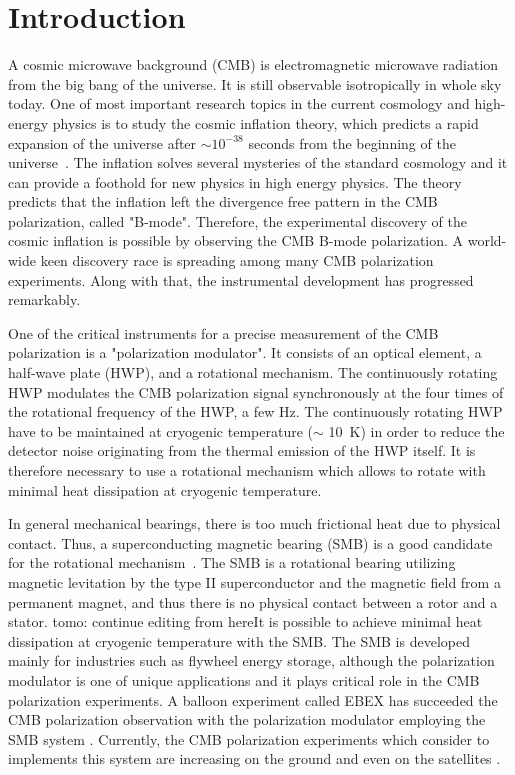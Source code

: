 \documentclass[a4paper]{jpconf}
\newcommand{\cred}[1]{{\color{red}#1}}
\begin{document}
\section*{Introduction}

A cosmic microwave background (CMB) is electromagnetic microwave radiation from the big bang of the universe.
It is still observable isotropically in whole sky today.
One of most important research topics in the current cosmology and high-energy physics is to study the cosmic inflation theory, which predicts a rapid expansion of the universe after $\sim 10^{-38}$ seconds from the beginning of the universe~\cite{inflation_sato,inflation_guth}.
The inflation solves several mysteries of the standard cosmology and it can provide a foothold for new physics in high energy physics.
The theory predicts that the inflation left the divergence free pattern in the CMB polarization,  called "B-mode".
Therefore, the experimental discovery of the cosmic inflation is possible by observing the CMB B-mode polarization.
A world-wide keen discovery race is spreading among many CMB polarization experiments.
Along with that, the instrumental development has progressed remarkably.

One of the critical instruments for a precise measurement of the CMB polarization is a "polarization modulator".
It consists of an optical element, a half-wave plate (HWP), and a rotational mechanism.
The continuously rotating HWP modulates the CMB polarization signal synchronously at the four times of the rotational frequency of the HWP, a few Hz.
The continuously rotating HWP have to be maintained at cryogenic temperature ($\sim$ 10~K) in order to reduce the detector noise originating from the thermal emission of the HWP itself.
It is therefore necessary to use a rotational mechanism which allows to rotate with minimal heat dissipation at cryogenic temperature.

In general mechanical bearings, there is too much frictional heat due to physical contact.
Thus, a superconducting magnetic bearing (SMB) is a good candidate for the rotational mechanism~\cite{smb}.
The SMB is a rotational bearing utilizing magnetic levitation by the type II superconductor and the magnetic field from a permanent magnet, and thus there is no physical contact between a rotor and a stator.
\cred{tomo: continue editing from here}It is possible to achieve minimal heat dissipation at cryogenic temperature with the SMB.
The SMB is developed mainly for industries such as flywheel energy storage,
although the polarization modulator is one of unique applications and it plays critical role in the CMB polarization experiments.
A balloon experiment called EBEX has succeeded the CMB polarization observation with the polarization modulator employing the SMB system \cite{ebex}.
Currently, the CMB polarization experiments which consider to implements this system are increasing on the ground and even on the satellites \cite{litebird}.
\end{document}
